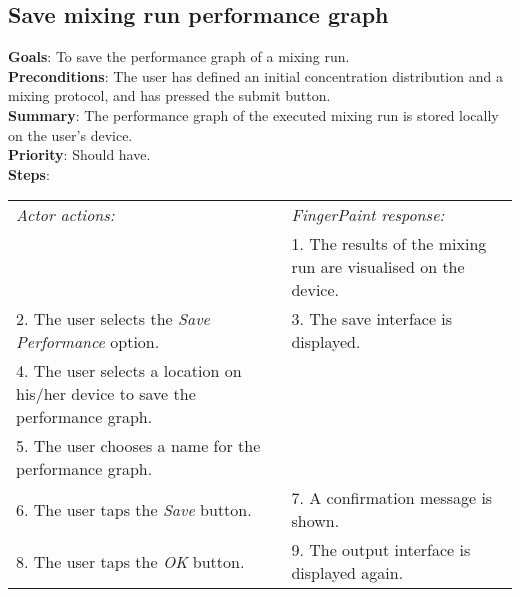 \begin{appendices}
  \section{Save mixing run performance graph}
  \textbf{Goals}: To save the performance graph of a mixing run.\\
  \textbf{Preconditions}: The user has defined an initial concentration distribution and a mixing protocol, and has pressed the submit button.\\
  \textbf{Summary}: The performance graph of the executed mixing run is stored locally on the user's device.\\
  \textbf{Priority}: Should have.\\
  \textbf{Steps}: \\
  \begin{tabular}{ p{} p{} }
  	\emph{Actor actions:} & \emph{FingerPaint response:} \\
	   & 1. The results of the mixing run are visualised on the device. \\
	 2. The user selects the \emph{Save Performance} option. & 3. The save interface is displayed.\\
	 4. The user selects a location on his/her device to save the performance graph. & \\
	 5. The user chooses a name for the performance graph. & \\
	 6. The user taps the \emph{Save} button. & 7. A confirmation message is shown. \\
	 8. The user taps the \emph{OK} button. & 9. The output interface is displayed again. \\
  \end{tabular}


\end{appendices}
